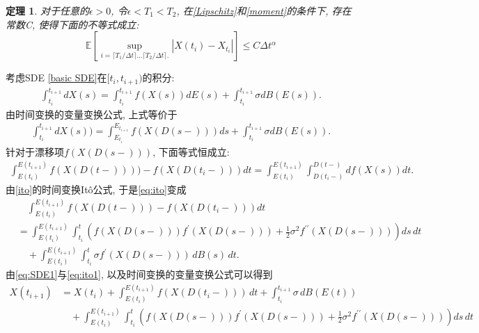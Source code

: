 \documentclass[12pt, final]{article}
\makeatletter
\numberwithin{equation}{section}
\numberwithin{figure}{section}
\numberwithin{table}{section}
\theoremstyle{plain}
\renewcommand{\proofname}{证明}
\newtheorem{Theorem}{定理}[section]   %
\theoremstyle{Definition}
\theoremstyle{Remark}
\renewenvironment{proof}[1][\proofname]{\par
	\pushQED{\qed}%
	\normalfont \topsep6\p@\@plus6\p@\relax
	\trivlist\item[\hskip\labelsep
	\bfseries #1\@addpunct{\, :\, }]\ignorespaces
}{%
	\popQED\endtrivlist\@endpefalse
}
\makeatother
\begin{document}
	\begin{Theorem}\label{main th}
		对于任意的$\epsilon>0$, 令$\epsilon < T_1 < T_2$, 在\textnormal{\cref{Lipschitz}}和\textnormal{\cref{moment}}的条件下, 存在常数C, 使得下面的不等式成立:
		$$\mathbb{E}\left[\sup\limits_{i=\lceil T_1/\Delta t \rceil\ldots \lceil T_2/\Delta t \rceil. } |X({t_i})-X_{t_i}|\right]\le C\Delta t^\alpha$$
	\end{Theorem}
	\begin{proof}
		
		考虑SDE \eqref{basic SDE}在$[t_i, t_{i+1})$的积分:
		\begin{align}
			\int_{t_i}^{t_{i+1}}dX(s)=\int_{t_i}^{t_{i+1}}f(X(s))dE(s)+\int_{t_i}^{t_{i+1}}\sigma dB(E(s)). 
		\end{align}
		由时间变换的变量变换公式\cite{kobayashi2011stochastic}, 上式等价于
		\begin{align}\label{eq:SDE1}
			\int_{t_i}^{t_{i+1}}dX(s))=\int_{E_{t_i}}^{E_{t_{i+1}}}f(X(D(s-)))ds+\int_{t_i}^{t_{i+1}}\sigma dB(E(s)). 
		\end{align}
		针对于漂移项$f(X(D(s-)))$, 下面等式恒成立:
		\begin{align}\label{eq:ito}
			\int_{E(t_i)}^{E(t_{i+1})} f(X(D(t-)))) - f(X(D(t_i-))) dt = \int_{E(t_i)}^{E(t_{i+1})} \int^{D(t-)}_{D(t_i-)} df(X(s)) dt. 
		\end{align}
		由\cref{ito}的时间变换It\^{o}公式, 于是\eqref{eq:ito}变成
		\begin{equation}\label{eq:ito1}
			\begin{aligned}
				&\quad\int_{E(t_i)}^{E(t_{i+1})} f(X(D(t-))) - f(X(D(t_i-))) dt \\
				&= \int_{E(t_i)}^{E(t_{i+1})} \int_{t_i}^{t} \left( f(X(D(s-))) f^{\prime}(X(D(s-))) + \frac{1}{2} \sigma^2 f^{\prime\prime}(X(D(s-))) \right) ds \, dt\\
				&\quad + \int_{E(t_i)}^{E(t_{i+1})} \int_{t_i}^{t} \sigma f^{\prime}(X(D(s-))) \, dB(s) \, dt . 
			\end{aligned}
		\end{equation}
		由\eqref{eq:SDE1}与\eqref{eq:ito1}, 以及时间变换的变量变换公式可以得到
		\begin{align*}
			X(t_{i+1}) 
			&= X(t_i) + \int_{E(t_i)}^{E(t_{i+1})} f(X({D(t_i-)})) \, dt + \int_{t_i}^{t_{i+1}} \sigma \, dB(E(t)) \\
			&\quad + \int_{E(t_i)}^{E(t_{i+1})} \int_{t_i}^{t}\left( f(X(D(s-))) f^{\prime}(X(D(s-))) + \frac{1}{2} \sigma^2 f^{\prime\prime}(X(D(s-))) \right) ds \, dt \\

\end{align*}
\end{proof}
\end{document}
